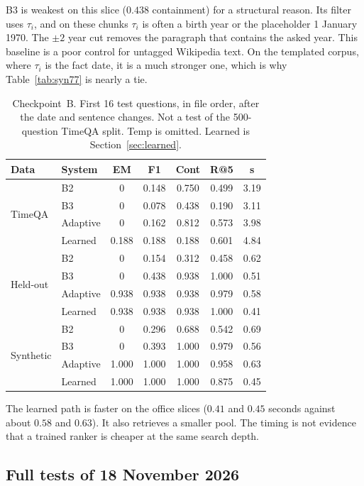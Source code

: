\documentclass[11pt,letterpaper]{article}
\begin{document}
B3 is weakest on this slice ($0.438$ containment) for a structural reason.
Its filter uses $\tau_i$, and on these chunks $\tau_i$ is often a birth year or the placeholder 1 January 1970.
The $\pm 2$ year cut removes the paragraph that contains the asked year.
This baseline is a poor control for untagged Wikipedia text.
On the templated corpus, where $\tau_i$ is the fact date, it is a much stronger one, which is why Table~\ref{tab:syn77} is nearly a tie.

\begin{table}[t]
\centering
\caption{Checkpoint~B. First 16 test questions, in file order, after the date and sentence changes. Not a test of the 500-question TimeQA split. Temp is omitted. Learned is Section~\ref{sec:learned}.}
\label{tab:slice}
\small
\begin{tabular}{llccccc}
\toprule
Data & System & EM & F1 & Cont & R@5 & s \\
\midrule
\multirow{4}{*}{TimeQA}
 & B2 & 0 & 0.148 & 0.750 & 0.499 & 3.19 \\
 & B3 & 0 & 0.078 & 0.438 & 0.190 & 3.11 \\
 & Adaptive & 0 & 0.162 & 0.812 & 0.573 & 3.98 \\
 & Learned & 0.188 & 0.188 & 0.188 & 0.601 & 4.84 \\
\midrule
\multirow{4}{*}{Held-out}
 & B2 & 0 & 0.154 & 0.312 & 0.458 & 0.62 \\
 & B3 & 0 & 0.438 & 0.938 & 1.000 & 0.51 \\
 & Adaptive & 0.938 & 0.938 & 0.938 & 0.979 & 0.58 \\
 & Learned & 0.938 & 0.938 & 0.938 & 1.000 & 0.41 \\
\midrule
\multirow{4}{*}{Synthetic}
 & B2 & 0 & 0.296 & 0.688 & 0.542 & 0.69 \\
 & B3 & 0 & 0.393 & 1.000 & 0.979 & 0.56 \\
 & Adaptive & 1.000 & 1.000 & 1.000 & 0.958 & 0.63 \\
 & Learned & 1.000 & 1.000 & 1.000 & 0.875 & 0.45 \\
\bottomrule
\end{tabular}
\end{table}

The learned path is faster on the office slices ($0.41$ and $0.45$ seconds against about $0.58$ and $0.63$).
It also retrieves a smaller pool.
The timing is not evidence that a trained ranker is cheaper at the same search depth.

\subsection{Full tests of 18 November 2026}
\label{sec:fulltest}
\end{document}
